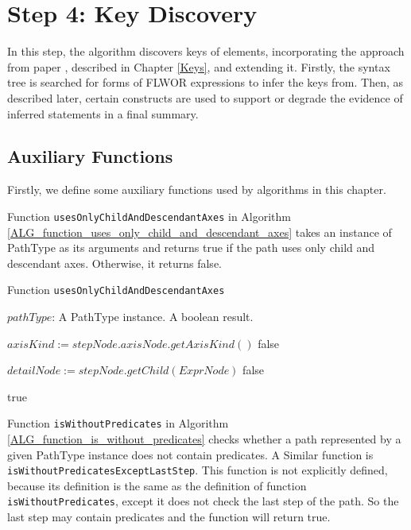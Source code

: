 
\section{Step 4: Key Discovery}
In this step, the algorithm discovers keys of elements, incorporating the approach from paper \cite{Necasky:2009:DXK:1529282.1529414}, described in Chapter \ref{Keys}, and extending it. Firstly, the syntax tree is searched for forms of FLWOR expressions to infer the keys from. Then, as described later, certain constructs are used to support or degrade the evidence of inferred statements in a final summary.

\subsection{Auxiliary Functions} \label{step_4_auxiliary_functions}
Firstly, we define some auxiliary functions used by algorithms in this chapter.

Function \texttt{usesOnlyChildAndDescendantAxes} in Algorithm \ref{ALG_function_uses_only_child_and_descendant_axes} takes an instance of PathType as its arguments and returns true if the path uses only child and descendant axes. Otherwise, it returns false.

\begin{algorithm}
\caption{Function \texttt{usesOnlyChildAndDescendantAxes}}
\label{ALG_function_uses_only_child_and_descendant_axes}
\begin{algorithmic}[1]
\REQUIRE $pathType$: A PathType instance.
\ENSURE A boolean result.

		\STATE $axisKind := stepNode.axisNode.getAxisKind()$
			\RETURN false
		\ENDIF
	\ENDIF
\ENDFOR

\STATE $detailNode := stepNode.getChild(ExprNode)$
			\RETURN false
		\ENDIF
	\ENDIF
\ENDIF

\RETURN true
\end{algorithmic}
\end{algorithm}

Function \texttt{isWithoutPredicates} in Algorithm \ref{ALG_function_is_without_predicates} checks whether a path represented by a given PathType instance does not contain predicates. A Similar function is  \texttt{isWithoutPredicatesExceptLastStep}. This function is not explicitly defined, because its definition is the same as the definition of function \texttt{isWithoutPredicates}, except it does not check the last step of the path. So the last step may contain predicates and the function will return true.


